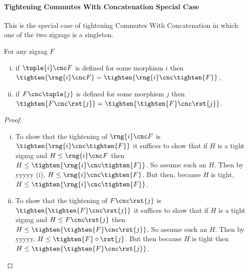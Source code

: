 \paragraph*{Tightening Commutes With Concatenation Special Case}
This is the special case of tightening Commutes With Concatenation in which one of the two zigzags is a singleton.
\begin{lemma}
For any zigzag $F$
\begin{enumerate}[(i)]
\item
if $\tuple{i} \cnc F$ is defined for some morphism $i$ then
$\tighten{\rng{i} \cnc F}
         = \tighten{\rng{i} \cnc \tighten{F}}$,
\item 
if $F \cnc \tuple{j}$ is defined for some morphism $j$ then
$\tighten{F \cnc \rst{j}}
         = \tighten{\tighten{F} \cnc \rst{j}}$.
\end{enumerate}
\end{lemma}
\begin{proof}
~
\begin{enumerate}[(i)]
\item %
To show that the tightening of $\rng{i} \cnc F$
is $\tighten{\rng{i}\cnc \tighten{F}}$ it suffices to show that if
$H$ is a tight zigzag and $H \leq \rng{i} \cnc F$ then
$H \leq \tighten{\rng{i}\cnc \tighten{F}}$. So assume such an $H$.
Then by yyyyy (i), $H \leq \rng{i} \cnc \tighten{F}$.
But then, because $H$ is tight,
$H \leq \tighten{\rng{i}\cnc \tighten{F}}$.
\item %
To show that the tightening of $F \cnc \rst{j}$ 
is $\tighten{\tighten{F}\cnc \rst{j}}$ it suffices to show that if
$H$ is a tight zigzag and $H \leq F \cnc \rst{j}$ then
$H \leq  \tighten{\tighten{F}\cnc \rst{j}}$. So assume such an $H$.
Then by yyyyy, $H \leq \tighten{F} \circ \rst{j}$. But then because $H$ is tight then $H \leq \tighten{\tighten{F} \cnc\rst{j}}$. 
\end{enumerate}
\end{proof}
